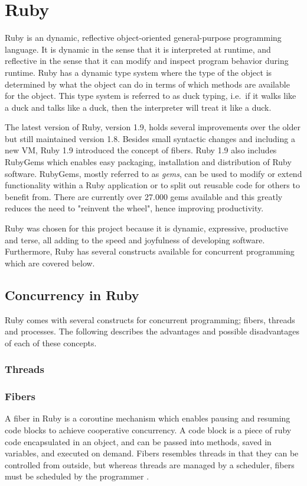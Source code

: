 \section{Ruby} %
\label{sec:ruby}

Ruby is an dynamic, reflective object-oriented general-purpose programming
language. It is dynamic in the sense that it is interpreted at runtime, and
reflective in the sense that it can modify and inspect program behavior during
runtime.  Ruby has a dynamic type system where the type of the object is
determined by what the object can do in terms of which methods are available
for the object. This type system is referred to as duck typing, i.e.\ if it
walks like a duck and talks like a duck, then the interpreter will treat it
like a duck.

The latest version of Ruby, version 1.9, holds several improvements over the
older but still maintained version 1.8. Besides small syntactic changes and
including a new VM, Ruby 1.9 introduced the concept of fibers. Ruby 1.9 also
includes RubyGems which enables easy packaging, installation and distribution of
Ruby software. RubyGems, mostly referred to as \textit{gems}, can be used to
modify or extend functionality within a Ruby application or to split out
reusable code for others to benefit from. There are currently over 27.000 gems
available and this greatly reduces the need to "reinvent the wheel", hence
improving productivity. 

Ruby was chosen for this project because it is dynamic, expressive, productive
and terse, all adding to the speed and joyfulness of developing software.
Furthermore, Ruby has several constructs available for concurrent programming
which are covered below.

\subsection{Concurrency in Ruby}
Ruby comes with several constructs for concurrent programming; fibers, threads
and processes. The following describes the advantages and possible disadvantages
of each of these concepts.

\subsubsection{Threads}


\subsubsection{Fibers}
A fiber in Ruby is a coroutine mechanism which enables pausing and resuming
code blocks to achieve cooperative concurrency. A code block is a
piece of ruby code encapsulated in an object, and can be passed into
methods, saved in variables, and executed on demand. Fibers resembles threads in
that they can be controlled from outside, but whereas threads are managed by a
scheduler, fibers must be scheduled by the programmer \cite{rubyfiber}.

